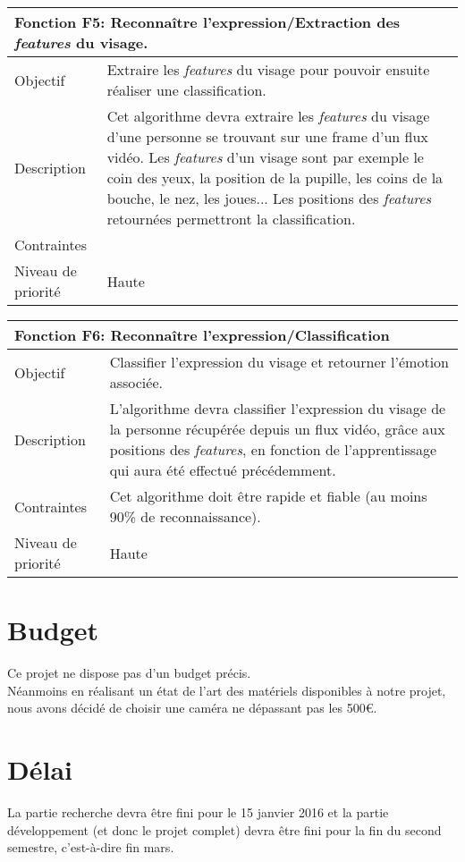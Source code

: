 \documentclass[poster]{polytech/polytech}
\begin{document}
\begin{tabular}{|l|p{12.5cm}|}
   \hline
   \multicolumn{2}{|l|}{\textbf{Fonction F5: Reconnaître l'expression/Extraction des \textit{features} du visage.}} \\
   \hline
   Objectif &Extraire les \textit{features} du visage pour pouvoir ensuite réaliser une classification. \\
   \hline
   Description &Cet algorithme devra extraire les \textit{features} du visage d'une personne se trouvant sur une frame d'un flux vidéo. Les \textit{features} d'un visage sont par exemple le coin des yeux, la position de la pupille, les coins de la bouche, le nez, les joues... Les positions des \textit{features} retournées permettront la classification. \\
   \hline
   Contraintes & \\
   \hline
   Niveau de priorité &Haute \\
   \hline
\end{tabular}

\begin{tabular}{|l|p{12.5cm}|}
   \hline
   \multicolumn{2}{|l|}{\textbf{Fonction F6: Reconnaître l'expression/Classification}} \\
   \hline
   Objectif &Classifier l'expression du visage et retourner l'émotion associée. \\
   \hline
   Description &L'algorithme devra classifier l'expression du visage de la personne récupérée depuis un flux vidéo, grâce aux positions des \textit{features}, en fonction de l'apprentissage qui aura été effectué précédemment. \\
   \hline
   Contraintes &Cet algorithme doit être rapide et fiable (au moins 90\% de reconnaissance). \\
   \hline
   Niveau de priorité &Haute \\
   \hline
\end{tabular}

\section{Budget}
Ce projet ne dispose pas d'un budget précis.\\
Néanmoins en réalisant un état de l'art des matériels disponibles à notre projet, nous avons décidé de choisir une caméra ne dépassant pas les 500€.

\section{Délai}
La partie recherche devra être fini pour le 15 janvier 2016 et la partie développement (et donc le projet complet) devra être fini pour la fin du second semestre, c'est-à-dire fin mars.
\end{document}

